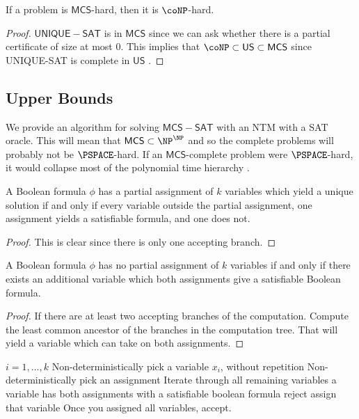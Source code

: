 \documentclass[runningheads,a4paper]{llncs}
\begin{document}
\begin{proposition}
If a problem is $\mathsf{MCS}$-hard, then it is $\coNP$-hard. 
\end{proposition}

\begin{proof}
$\mathsf{UNIQUE-SAT}$ is in $\mathsf{MCS}$ since we can ask whether there is a partial certificate of size at most $0$. This implies that $\coNP \subset \mathsf{US} \subset \mathsf{MCS}$ since UNIQUE-SAT is complete in $\mathsf{US}$ \cite{blass1982unique}.
\end{proof}

\subsection{Upper Bounds}

We provide an algorithm for solving $\mathsf{MCS-SAT}$ with an NTM with a SAT oracle. This will mean that $\mathsf{MCS} \subset \NP^{\NP}$ and so the complete problems will probably not be $\PSPACE$-hard. If an $\mathsf{MCS}$-complete problem were $\PSPACE$-hard, it would collapse most of the polynomial time hierarchy \cite{stockmeyer1976polynomial}. 

\begin{lemma}
A Boolean formula $\phi$ has a partial assignment of $k$ variables which yield a unique solution if and only if every variable outside the partial assignment, one assignment yields a satisfiable formula, and one does not.
\end{lemma}

\begin{proof}
This is clear since there is only one accepting branch.
\end{proof}

\begin{lemma}
A Boolean formula $\phi$ has no partial assignment of $k$ variables if and only if there exists an additional variable which both assignments give a satisfiable Boolean formula.
\end{lemma}

\begin{proof}
If there are at least two accepting branches of the computation. Compute the least common ancestor of the branches in the computation tree. That will yield a variable which can take on both assignments. 
\end{proof}

\begin{codebox}
\li \For $i = 1, ..., k$ \Then
\li Non-deterministically pick a variable $x_i$, without repetition
\li Non-deterministically pick an assignment \End
\li Iterate through all remaining variables \Then
\li \If a variable has both assignments with a satisfiable boolean formula \Then
\li reject
\li \Else assign that variable \End \End
\li Once you assigned all variables, accept.
\end{codebox}
\end{document}
